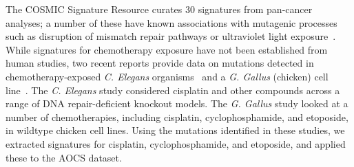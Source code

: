 The COSMIC Signature Resource curates 30 signatures from pan-cancer analyses; a number of these have known associations with mutagenic processes such as disruption of mismatch repair pathways or ultraviolet light exposure~\cite{364242}. While signatures for chemotherapy exposure have not been established from human studies, two recent reports provide data on mutations detected in chemotherapy-exposed \textit{C. Elegans} organisms~\cite{Meier_2014} and a \textit{G. Gallus} (chicken) cell line~\cite{Szikriszt_2016}. The \textit{C. Elegans} study considered cisplatin and other compounds across a range of DNA repair-deficient knockout models. The \textit{G. Gallus} study looked at a number of chemotherapies, including cisplatin, cyclophosphamide, and etoposide, in wildtype chicken cell lines. Using the mutations identified in these studies, we extracted signatures for cisplatin, cyclophosphamide, and etoposide, and applied these to the AOCS dataset.